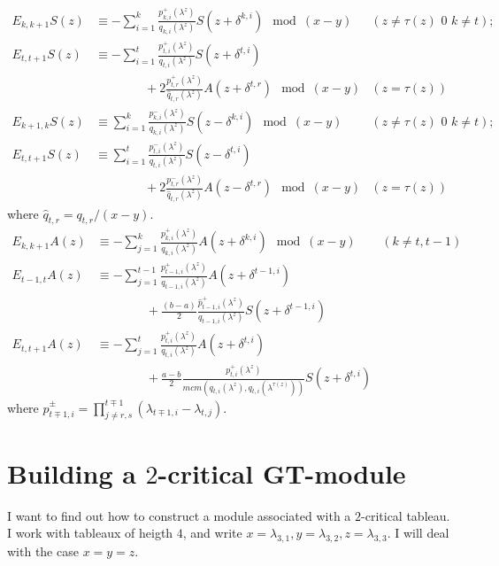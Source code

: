 \documentclass[11pt,fleqn]{article}
\begin{document}
\begin{align*}
E_{k,k+1} S(z)
	&\equiv -\sum_{i=1}^k \frac{p_{k,i}^+(\lambda^z)}{q_{k,i}(\lambda^z)} 
	S(z+\delta^{k,i}) \mod (x-y) &(z \neq \tau(z) \mbox{ 0 } k \neq t); \\
E_{t,t+1} S(z)
	&\equiv -\sum_{i=1}^t \frac{p_{t,i}^+(\lambda^z)}{q_{t,i}(\lambda^z)} 
	S(z+\delta^{t,i}) \\&\qquad \qquad + 2\frac{p^+_{t,r}(\lambda^z)}{\hat q_{t,r}(\lambda^z)} A(z+\delta^{t,r}) \mod (x-y) &(z = \tau(z)) \\
E_{k+1,k} S(z)
	&\equiv \sum_{i=1}^k \frac{p_{k,i}^-(\lambda^z)}{q_{k,i}(\lambda^z)} 
	S(z-\delta^{k,i}) \mod (x-y) &(z \neq \tau(z) \mbox{ 0 } k \neq t); \\
E_{t,t+1} S(z)
	&\equiv \sum_{i=1}^t \frac{p_{t,i}^-(\lambda^z)}{q_{t,i}(\lambda^z)} 
	S(z-\delta^{t,i}) \\&\qquad \qquad + 2\frac{p^-_{t,r}(\lambda^z)}{\hat q_{t,r}(\lambda^z)} A(z-\delta^{t,r}) \mod (x-y) &(z = \tau(z))
\end{align*}
where $\hat q_{t,r} = q_{t,r}/(x-y)$.
\begin{align*}
E_{k,k+1} A(z)
	&\equiv -\sum_{j=1}^k \frac{p_{k,i}^+(\lambda^z)}{q_{k,i}(\lambda^z)}
	A(z+\delta^{k,i}) \mod (x-y)&(k \neq t,t-1) \\
E_{t-1,t} A(z) 
	&\equiv -\sum_{j=1}^{t-1} \frac{p_{t-1,i}^+(\lambda^z)}
	{q_{t-1,i}(\lambda^z)} A(z+\delta^{t-1,i}) \\
	&\qquad \qquad + \frac{(b-a)}{2}\frac{\hat p^+_{t-1,i}(\lambda^z)}
	{q_{t-1,i}(\lambda^z)} S(z + \delta^{t-1,i})\\
E_{t,t+1} A(z)
	&\equiv -\sum_{j=1}^{t} \frac{p_{t,i}^+(\lambda^z)}
	{q_{t,i}(\lambda^z)} A(z+\delta^{t,i}) \\
	&\qquad \qquad + \frac{a-b}{2} \frac{p_{t,i}^+(\lambda^z)}
	{mcm(q_{t,i}(\lambda^z),q_{t,i}(\lambda^{\tau(z)}))} S(z + \delta^{t,i})
\end{align*}
where $\displaystyle \hat p_{t \mp 1,i}^\pm = \prod_{j \neq r,s}^{t\mp 1} 
(\lambda_{t\mp 1, i} - \lambda_{t,j})$.


\newpage

\section{Building a $2$-critical GT-module}

I want to find out how to construct a module associated with a $2$-critical
tableau. I work with tableaux of heigth $4$, and write $x = \lambda_{3,1}, y 
= \lambda_{3,2}, z = \lambda_{3,3}$. I will deal with the case $x = y = z$.
\end{document}
